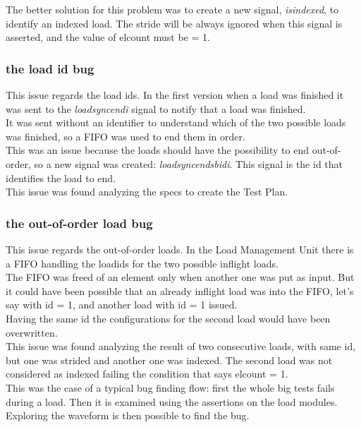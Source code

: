 The better solution for this problem was to create a new signal, \emph{is\+indexed}, to identify an indexed load. The stride will be always ignored when this signal is asserted, and the value of el\+count must be = 1.\\

\subsubsection{the load id bug}
This issue regards the load ids. In the first version when a load was finished it was sent to the \emph{load\+sync\+end\+i} signal to notify that a load was finished.\\

It was sent without an identifier to understand which of the two possible loads was finished, so a FIFO was used to end them in order.\\

This was an issue because the loads should have the possibility to end out-of-order, so a new signal was created: \emph{load\+sync\+end\+sb\+id\+i}. This signal is the id that identifies the load to end.\\

This issue was found analyzing the specs to create the Test Plan.

\subsubsection{the out-of-order load bug}
This issue regards the out-of-order loads. In the Load Management Unit there is a FIFO handling the load\+ids for the two possible inflight loads.\\

The FIFO was freed of an element only when another one was put as input. But it could have been possible that an already inflight load was into the FIFO, let's say with id = 1, and another load with id = 1 issued. \\
Having the same id the configurations for the second load would have been overwritten.\\

This issue was found analyzing the result of two consecutive loads, with same id, but one was strided and another one was indexed. The second load was not considered as indexed failing the condition that says el\+count = 1.\\

This was the case of a typical bug finding flow: first the whole big tests fails during a load. Then it is examined using the assertions on the load modules. Exploring the waveform is then possible to find the bug.\\

